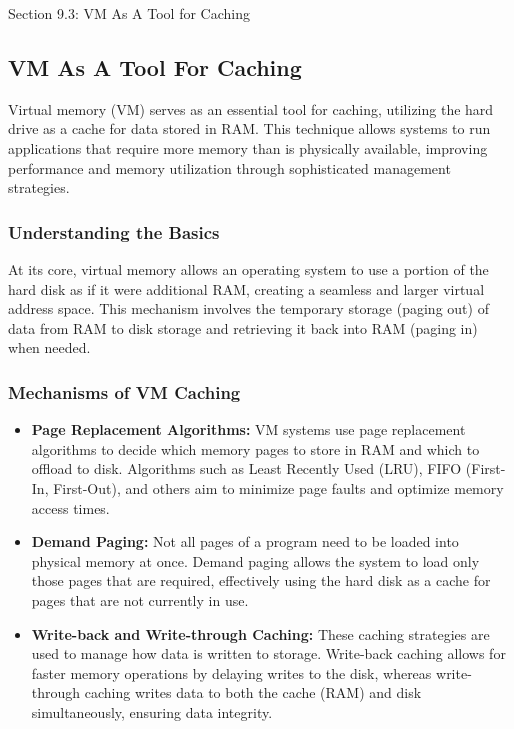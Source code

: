 \begin{notes}{Section 9.3: VM As A Tool for Caching}
    \subsection*{VM As A Tool For Caching}

    Virtual memory (VM) serves as an essential tool for caching, utilizing the hard drive as a cache for data stored in RAM. This technique allows systems to run applications that require more memory 
    than is physically available, improving performance and memory utilization through sophisticated management strategies. \vspace*{1em}
    
    \subsubsection*{Understanding the Basics}
    
    At its core, virtual memory allows an operating system to use a portion of the hard disk as if it were additional RAM, creating a seamless and larger virtual address space. This mechanism involves 
    the temporary storage (paging out) of data from RAM to disk storage and retrieving it back into RAM (paging in) when needed. \vspace*{1em}
    
    \subsubsection*{Mechanisms of VM Caching}
    
    \begin{itemize}
        \item \textbf{Page Replacement Algorithms:} VM systems use page replacement algorithms to decide which memory pages to store in RAM and which to offload to disk. Algorithms such as Least 
        Recently Used (LRU), FIFO (First-In, First-Out), and others aim to minimize page faults and optimize memory access times.
        \item \textbf{Demand Paging:} Not all pages of a program need to be loaded into physical memory at once. Demand paging allows the system to load only those pages that are required, effectively 
        using the hard disk as a cache for pages that are not currently in use.
        \item \textbf{Write-back and Write-through Caching:} These caching strategies are used to manage how data is written to storage. Write-back caching allows for faster memory operations by 
        delaying writes to the disk, whereas write-through caching writes data to both the cache (RAM) and disk simultaneously, ensuring data integrity.
    \end{itemize}
    

\end{notes}

